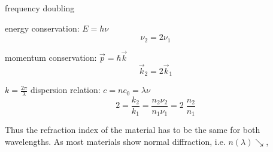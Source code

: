 frequency doubling

energy conservation: $E = h \nu$
\begin{equation}
	\nu_2 = 2 \nu_1
\end{equation}

momentum conservation: $\vec p = \hbar \vec k$
\begin{equation}
	\vec k_2 = 2 \vec k_1
\end{equation}

$k = \frac{2 \pi}{\lambda}$
dispersion relation: $c = n c_0 = \lambda \nu$
\begin{equation}
2 = \frac{k_2}{k_1} = \frac{n_2 \nu_2}{n_1 \nu_1} = 2\;\frac{n_2}{n_1}
\end{equation}

Thus the refraction index of the material has to be the same for both wavelengths. As most materials show normal diffraction, i.e. $n(\lambda) \searrow$, 
